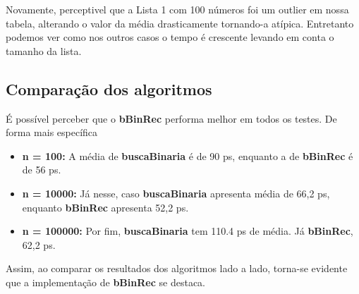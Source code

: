 Novamente, perceptivel que a Lista 1 com 100 números foi um outlier em nossa tabela, alterando o valor da média drasticamente tornando-a atípica. Entretanto podemos ver como nos outros casos o tempo é crescente levando em conta o tamanho da lista.

\subsection{Comparação dos algoritmos}

É possível perceber que o \textbf{bBinRec} performa melhor em todos os testes. De forma mais específica

\begin{itemize}
  \item \textbf{n = 100:} A média de \textbf{buscaBinaria} é de 90 ps, enquanto a de \textbf{bBinRec} é de 56 ps.

  \item \textbf{n = 10000:} Já nesse, caso \textbf{buscaBinaria} apresenta média de 66,2 ps, enquanto \textbf{bBinRec} apresenta 52,2 ps.

  \item \textbf{n = 100000:} Por fim, \textbf{buscaBinaria} tem 110.4 ps de média. Já \textbf{bBinRec}, 62,2 ps.
\end{itemize}

Assim, ao comparar os resultados dos algoritmos lado a lado, torna-se evidente que a implementação de \textbf{bBinRec} se destaca.
